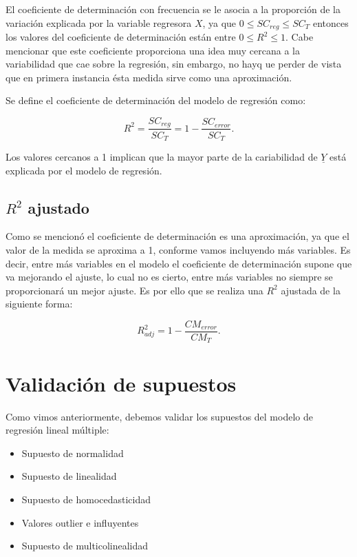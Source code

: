 \documentclass[
  a4paper,
  oneside,
  openany]{book}
\begin{document}
El coeficiente de determinación con frecuencia se le asocia a la proporción de la variación explicada por la variable regresora \(X\), ya que \(0 \leq SC_{reg} \leq SC_{T}\) entonces los valores del coeficiente de determinación están entre \(0 \leq R^2 \leq 1.\) Cabe mencionar que este coeficiente proporciona una idea muy cercana a la variabilidad que cae sobre la regresión, sin embargo, no hayq ue perder de vista que en primera instancia ésta medida sirve como una aproximación.

Se define el coeficiente de determinación del modelo de regresión como:

\[R^2=\frac{SC_{reg}}{SC_{T}}=1-\frac{SC_{error}}{SC_{T}}.\]

Los valores cercanos a 1 implican que la mayor parte de la cariabilidad de \(\underline{Y}\) está explicada por el modelo de regresión.

\hypertarget{r2-ajustado}{%
\section{\texorpdfstring{\(R^2\) ajustado}{R\^{}2 ajustado}}\label{r2-ajustado}}

Como se mencionó el coeficiente de determinación es una aproximación, ya que el valor de la medida se aproxima a 1, conforme vamos incluyendo más variables. Es decir, entre más variables en el modelo el coeficiente de determinación supone que va mejorando el ajuste, lo cual no es cierto, entre más variables no siempre se proporcionará un mejor ajuste.
Es por ello que se realiza una \(R^2\) ajustada de la siguiente forma:

\[R^2_{adj}=1- \frac{CM_{error}}{CM_{T}}.\]

\hypertarget{validaciuxf3n-de-supuestos-1}{%
\chapter{Validación de supuestos}\label{validaciuxf3n-de-supuestos-1}}

Como vimos anteriormente, debemos validar los supuestos del modelo de regresión lineal múltiple:

\begin{itemize}
\item
  Supuesto de normalidad
\item
  Supuesto de linealidad
\item
  Supuesto de homocedasticidad
\item
  Valores outlier e influyentes
\item
  Supuesto de multicolinealidad
\end{itemize}
\end{document}
